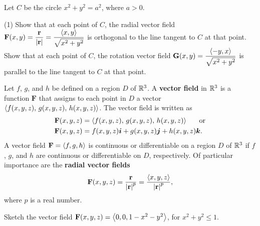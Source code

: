 \documentclass[../mathNotesPreamble]{subfiles}
\begin{document}
  \begin{ex*}
    Let $C$ be the circle $x^2+y^2=a^2$, where $a>0$.
  \end{ex*}
  \begin{tasks}[after-item-skip=\stretch{1}, label=\alph*)](1)
    \task 
      Show that at each point of $C$, the radial vector field $\displaystyle\mathbf F(x,y)=\frac{{\mathbf{r}}}{{\left\vert{\mathbf{r}}\right\vert}}=\frac{{\left\langle x,y \right\rangle}}{\sqrt{x^2+y^2}}$ is orthogonal to the line tangent to $C$ at that point.
    \task 
      Show that at each point of $C$, the rotation vector field $\displaystyle\mathbf G(x,y)=\frac{{\left\langle -y,x \right\rangle}}{\sqrt{x^2+y^2}}$ is parallel to the line tangent to $C$ at that point.
  \end{tasks}
  \pagebreak

  \begin{defn*}
    Let $f$, $g$, and $h$ be defined on a region $D$ of $\mathbb{R}^3$. A \textbf{vector field} in $\mathbb{R}^3$ is a function $\mathbf F$ that assigns to each point in $D$ a vector ${\left\langle f(x,y,z),\,g(x,y,z),\,h(x,y,z) \right\rangle}$. The vector field is written as
      \begin{align*}
        \mathbf F(x,y,z)&= {\left\langle f(x,y,z),\,g(x,y,z),\,h(x,y,z) \right\rangle}\hspace*{15pt} \textnormal{ or}\\
        \mathbf F(x,y,z)&= f(x,y,z){\bm{i}}+g(x,y,z){\bm{j}}+h(x,y,z){\bm{k}}.
      \end{align*}
    A vector field $\mathbf F={\left\langle f,g,h \right\rangle}$ is continuous or differentiable on a region $D$ of $\mathbb{R}^3$ if $f$, $g$, and $h$ are continuous or differentiable on $D$, respectively. Of particular importance are the \textbf{radial vector fields}
      \[\mathbf F(x,y,z)=\frac{{\mathbf{r}}}{{\left\vert{\mathbf{r}}\right\vert}^p}=\frac{{\left\langle x,y,z \right\rangle}}{{\left\vert{\mathbf{r}}\right\vert}^p},\]
    where $p$ is a real number.
  \end{defn*}
  \begin{ex*}
    Sketch the vector field $\mathbf F(x,y,z)={\left\langle 0,0,1-x^2-y^2 \right\rangle}$, for $x^2+y^2\leq 1$.
  \end{ex*}
  \begin{center}
  \end{center}
\end{document}
